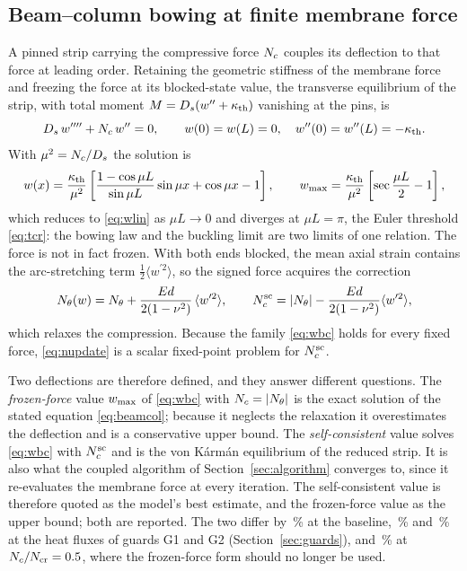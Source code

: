 \subsection{Beam--column bowing at finite membrane force}
\label{sec:beamcolumn}
A pinned strip carrying the compressive force $N_c$ couples its deflection to that force at leading
order. Retaining the geometric stiffness of the membrane force and freezing the force at its
blocked-state value, the transverse equilibrium of the strip, with total moment $M=D_s(w^{\prime\prime}+\kappa_{\mathrm{th}})$
vanishing at the pins, is
\begin{equation}
D_s\,w^{\prime\prime\prime\prime}+N_c\,w^{\prime\prime}=0,\qquad w(0)=w(L)=0,\quad
w^{\prime\prime}(0)=w^{\prime\prime}(L)=-\kappa_{\mathrm{th}}. \label{eq:beamcol}
\end{equation}
With $\mu^2=N_c/D_s$ the solution is
\begin{equation}
w(x)=\frac{\kappa_{\mathrm{th}}}{\mu^2}\left[\frac{1-\cos\mu L}{\sin\mu L}\sin\mu x+\cos\mu x-1\right],\qquad
w_{\max}=\frac{\kappa_{\mathrm{th}}}{\mu^2}\left[\sec\frac{\mu L}{2}-1\right], \label{eq:wbc}
\end{equation}
which reduces to \eqref{eq:wlin} as $\mu L\to0$ and diverges at $\mu L=\pi$, the Euler threshold
\eqref{eq:tcr}: the bowing law and the buckling limit are two limits of one relation. The force
is not in fact frozen. With both ends blocked, the mean axial strain contains the arc-stretching
term $\tfrac12\langle w^{\prime2}\rangle$, so the signed force acquires the correction
\begin{equation}
N_\theta(w)=N_\theta+\frac{Ed}{2(1-\nu^2)}\,\langle w^{\prime2}\rangle,\qquad
N_c^{\mathrm{sc}}=|N_\theta|-\frac{Ed}{2(1-\nu^2)}\langle w^{\prime2}\rangle, \label{eq:nupdate}
\end{equation}
which relaxes the compression. Because the family \eqref{eq:wbc} holds for every fixed force,
\eqref{eq:nupdate} is a scalar fixed-point problem for $N_c^{\mathrm{sc}}$.

Two deflections are therefore defined, and they answer different questions. The \emph{frozen-force}
value $w_{\max}$ of \eqref{eq:wbc} with $N_c=|N_\theta|$ is the exact solution of the stated
equation \eqref{eq:beamcol}; because it neglects the relaxation it overestimates the deflection and
is a conservative upper bound. The \emph{self-consistent} value solves \eqref{eq:wbc} with
$N_c^{\mathrm{sc}}$ and is the von K\'arm\'an equilibrium of the reduced strip. It is also what the
coupled algorithm of Section~\ref{sec:algorithm} converges to, since it re-evaluates the membrane force at
every iteration. The self-consistent value is therefore quoted as the model's best estimate, and the
frozen-force value as the upper bound; both are reported. The two differ by \NumExcessFrozen\,\% at
the baseline, \NumExcessW\,\% and \NumExcessS\,\% at the heat fluxes of guards G1 and G2
(Section~\ref{sec:guards}), and \NumExcessB\,\% at $N_c/N_{\mathrm{cr}}=0.5$, where the frozen-force form should
no longer be used.

